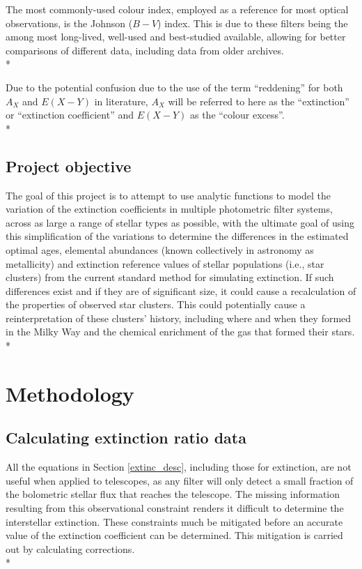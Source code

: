 \documentclass[12pt, a4paper]{report}
\begin{document}
The most commonly-used colour index, employed as a reference for most optical observations, is the Johnson ($B-V$) index. This is due to these filters being the among most long-lived, well-used and best-studied available, allowing for better comparisons of different data, including data from older archives.\\*

Due to the potential confusion due to the use of the term ``reddening'' for both $A_{X}$ and $E(X-Y)$ in literature, $A_{X}$ will be referred to here as the ``extinction'' or ``extinction coefficient'' and $E(X-Y)$ as the ``colour excess''.\\*

\section{Project objective}
The goal of this project is to attempt to use analytic functions to model the variation of the extinction coefficients in multiple photometric filter systems, across as large a range of stellar types as possible, with the ultimate goal of using this simplification of the variations to determine the differences in the estimated optimal ages, elemental abundances (known collectively in astronomy as metallicity) and extinction reference values of stellar populations (i.e., star clusters) from the current standard method for simulating extinction. If such differences exist and if they are of significant size, it could cause a recalculation of the properties of observed star clusters. This could potentially cause a reinterpretation of these clusters' history, including where and when they formed in the Milky Way and the chemical enrichment of the gas that formed their stars. \\*



\chapter{Methodology}
\section{Calculating extinction ratio data}

All the equations in Section \ref{extinc_desc}, including those for extinction, are not useful when applied to telescopes, as any filter will only detect a small fraction of the bolometric stellar flux that reaches the telescope. The missing information resulting from this observational constraint renders it difficult to determine the interstellar extinction. These constraints much be mitigated before an accurate value of the extinction coefficient can be determined. This mitigation is carried out by calculating corrections.\\*
\end{document}
